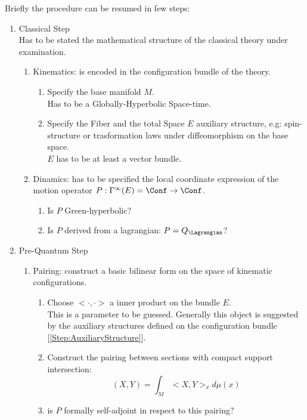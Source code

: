 \documentclass[Main]{subfiles}
\begin{document}
	Briefly the procedure can be resumed in few steps:
 	\begin{enumerate}
   		\item Classical Step\\
   			Has to be stated the mathematical structure of the classical theory under examination.
   			\begin{enumerate}
   				\item Kinematics: is encoded in the configuration bundle of the theory.
   					\begin{enumerate}
   						\item Specify the base manifold $M$. \\Has to be a Globally-Hyperbolic Space-time.
   						\item\label{Step:AuxiliaryStructure} Specify the Fiber and the total Space $E$ auxiliary structure, e.g: spin-structure or trasformation laws under diffeomorphism on the base space.\\$E$ has to be at least a vector bundle.
   					\end{enumerate}
   			
   				\item\label{Step:ClassicalDynamicsConditions} Dinamics: has to be specified the local coordinate expression of the motion operator $P: \Gamma^\infty (E)= \Conf \rightarrow \Conf$.
   				   	\begin{enumerate}
   						\item Is $P$ Green-hyperbolic?
   						\item Is $P$ derived from a lagrangian: $P=Q_\Lagrangian$? 
   					\end{enumerate}
   			\end{enumerate}
   			
   		\item Pre-Quantum Step
   		   	\begin{enumerate}
   				\item Pairing: construct a basic bilinear form on the space of kinematic configurations.
   					\begin{enumerate}
   						\item Choose $<\cdot,\cdot>$ a inner product on the bundle $E$.\\ 
						This is a parameter to be guessed. Generally this object is suggested by the auxiliary structures defined on the configuration bundle [\ref{Step:AuxiliaryStructure}].
   						\item Construct the pairing between sections with compact support intersection:
   							\begin{displaymath}
   								(X,Y) = \int_M <X,Y>_x d\mu(x)
   							\end{displaymath}
   						\item is $P$ formally self-adjoint in respect to this pairing?
   					\end{enumerate}
   					

\end{enumerate}
\end{enumerate}
\end{document}

